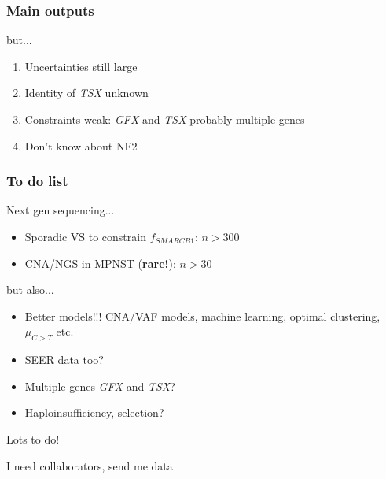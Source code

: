 \documentclass{beamer}
\begin{document}
\begin{frame}
    \frametitle{Main outputs}
    but...
    \begin{enumerate}
        \item Uncertainties still large
        \item Identity of \emph{TSX} unknown
        \item Constraints weak: \emph{GFX} and \emph{TSX} probably multiple genes
        \item Don't know about NF2
    \end{enumerate}
\end{frame}

\begin{frame}
    \frametitle{To do list}

    Next gen sequencing...
    \begin{itemize}
        \item Sporadic VS to constrain $f_{SMARCB1}$: $n > 300$
        \item CNA/NGS in MPNST (\textbf{rare!}): $n > 30$
    \end{itemize}

    but also...
    \begin{itemize}
        \item Better models!!! CNA/VAF models, machine learning, optimal clustering, $\mu_{C>T}$ etc.
        \item SEER data too?
        \item Multiple genes \emph{GFX} and \emph{TSX}? 
        \item Haploinsufficiency, selection?
    \end{itemize}

    \begin{center}
        Lots to do!

        \;

        \huge{I need collaborators, send me data}
    \end{center}
\end{frame}

%
%
\end{document}
